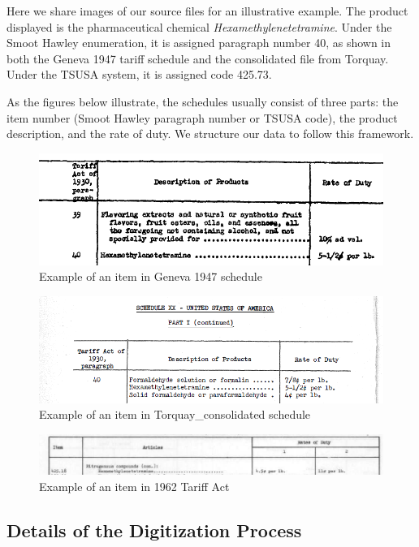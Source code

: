 \documentclass[
  12pt,
]{article}
\begin{document}
Here we share images of our source files for an illustrative example. The product displayed is the pharmaceutical chemical \emph{Hexamethylenetetramine}. Under the Smoot Hawley enumeration, it is assigned paragraph number 40, as shown in both the Geneva 1947 tariff schedule and the consolidated file from Torquay. Under the TSUSA system, it is assigned code 425.73.

As the figures below illustrate, the schedules usually consist of three parts: the item number (Smoot Hawley paragraph number or TSUSA code), the product description, and the rate of duty. We structure our data to follow this framework.

\begin{figure}
\centering
\includegraphics{Geneva47.png}
\caption{Example of an item in Geneva 1947 schedule}
\end{figure}

\begin{figure}
\centering
\includegraphics{Torquay.png}
\caption{Example of an item in Torquay\_consolidated schedule}
\end{figure}

\begin{figure}
\centering
\includegraphics{TSUSA.png}
\caption{Example of an item in 1962 Tariff Act}
\end{figure}

\newpage

\hypertarget{digdetails}{%
\subsection{Details of the Digitization Process}\label{digdetails}}
\end{document}
